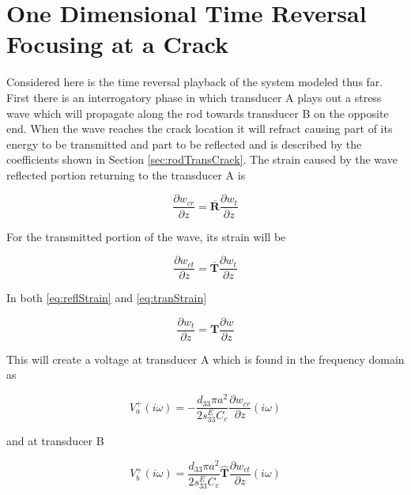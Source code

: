\section{One Dimensional Time Reversal Focusing at a Crack}
Considered here is the time reversal playback of the system modeled thus far. First there is an interrogatory phase in which transducer A plays out a stress wave which will propagate along the rod towards transducer B on the opposite end. When the wave reaches the crack location it will refract causing part of its energy to be transmitted and part to be reflected and is described by the coefficients shown in Section \ref{sec:rodTransCrack}. The strain caused by the wave reflected portion returning to the transducer A is

\begin{equation}
\frac{\partial w_{cr}}{\partial z} = \overline{\boldsymbol{R}}\frac{\partial w_t}{\partial z}
\label{eq:reflStrain}
\end{equation}

For the transmitted portion of the wave, its strain will be
  
\begin{equation}
\frac{\partial w_{ct}}{\partial z} = \overline{\boldsymbol{T}}\frac{\partial w_t}{\partial z}
\label{eq:tranStrain}
\end{equation}

In both \ref{eq:reflStrain} and \ref{eq:tranStrain}

\begin{equation}
\frac{\partial w_t}{\partial z} = \boldsymbol{T} \frac{\partial w}{\partial z}
\end{equation}



This will create a voltage at transducer A which is found in the frequency domain as

\begin{equation}
V^+_a(i\omega) = -\frac{d_{33} \pi a^2}{2 s^E_{33} C_c} \frac{\partial w_{cr}}{\partial z} (i\omega)
\end{equation}

and at transducer B

\begin{equation}
V^+_b(i\omega) = \frac{d_{33} \pi a^2}{2 s^E_{33} C_c} \boldsymbol{\hat{T}}\frac{\partial w_{ct}}{\partial z} (i\omega)
\end{equation}

